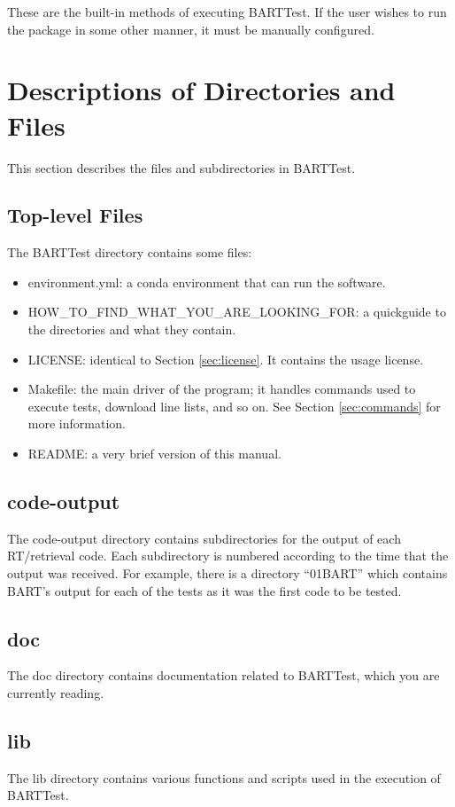 \documentclass[letterpaper, 12pt]{article}
\begin{document}
These are the built-in methods of executing BARTTest. If the user wishes to 
run the package in some other manner, it must be manually configured.

\section{Descriptions of Directories and Files}
\label{sec:files}

This section describes the files and subdirectories in BARTTest.

\subsection{Top-level Files}
The BARTTest directory contains some files:
\begin{itemize} \itemsep0pt
  \item environment.yml: a conda environment that can run the software.
  \item HOW{\_}TO{\_}FIND{\_}WHAT{\_}YOU{\_}ARE{\_}LOOKING{\_}FOR: a quickguide to the directories and what they contain.
  \item LICENSE: identical to Section \ref{sec:license}. It contains the 
        usage license.
  \item Makefile: the main driver of the program; it handles commands used 
        to execute tests, download line lists, and so on. See Section 
        \ref{sec:commands} for more information.
  \item README: a very brief version of this manual.
\end{itemize}

\subsection{code-output}
\label{sec:output}
The code-output directory contains subdirectories for the output of each RT/retrieval code. 
Each subdirectory is numbered according to the time that the output was received. 
For example, there is a directory ``01BART'' which contains BART's output for each of the tests as it was the first code to be tested.

\subsection{doc}
The doc directory contains documentation related to BARTTest, which you are currently reading.

\subsection{lib}
The lib directory contains various functions and scripts used in the execution 
of BARTTest.
\end{document}
